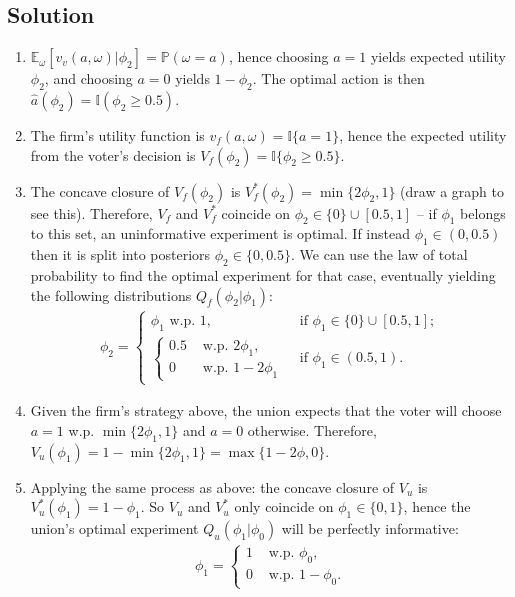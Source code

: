 \documentclass[a4paper]{article}
\newif\ifsolutions
\begin{document}
\ifsolutions
\subsection*{Solution}
\begin{enumerate}
	\item $\mathbb{E}_\omega[v_v(a,\omega)|\phi_2] = \mathbb{P}( \omega = a )$, hence choosing $a=1$ yields expected utility $\phi_2$, and choosing $a=0$ yields $1-\phi_2$. The optimal action is then $\hat{a}(\phi_2) = \mathbb{I}(\phi_2 \geq 0.5)$.
	
	\item The firm's utility function is $v_f(a,\omega) = \mathbb{I}\{a=1\}$, hence the expected utility from the voter's decision is $V_f(\phi_2) = \mathbb{I}\{\phi_2 \geq 0.5\}$.
	
	\item The concave closure of $V_f(\phi_2)$ is $V^*_f(\phi_2) = \min \{2\phi_2, 1 \}$ (draw a graph to see this). Therefore, $V_f$ and $V^*_f$ coincide on $\phi_2 \in \{0\} \cup [0.5,1]$ -- if $\phi_1$ belongs to this set, an uninformative experiment is optimal. If instead $\phi_1 \in (0,0.5)$ then it is split into posteriors $\phi_2 \in \{0,0.5\}$. We can use the law of total probability to find the optimal experiment for that case, eventually yielding the following distributions $Q_f(\phi_2|\phi_1)$:
	\begin{align*}
		\phi_2 = 
		\begin{cases}
			\phi_1 \text{ w.p. } 1, & \text{ if } \phi_1 \in \{0\} \cup [0.5,1];
			\\
			\begin{cases}
				0.5 & \text{ w.p. } 2 \phi_1,
				\\
				0 & \text{ w.p. } 1-2 \phi_1
			\end{cases}
			& \text{ if } \phi_1 \in (0.5,1).
		\end{cases}
	\end{align*}
	
	\item Given the firm's strategy above, the union expects that the voter will choose $a=1$ w.p. $\min\{2\phi_1, 1\}$ and $a=0$ otherwise. Therefore, $V_u(\phi_1) = 1 - \min\{2\phi_1, 1\} = \max \{ 1-2\phi, 0 \}$.
	
	\item Applying the same process as above: the concave closure of $V_u$ is $V^*_u(\phi_1) = 1-\phi_1$. So $V_u$ and $V^*_u$ only coincide on $\phi_1 \in \{0,1\}$, hence the union's optimal experiment $Q_u(\phi_1|\phi_0)$ will be perfectly informative:
	\begin{align*}
		\phi_1 = 
		\begin{cases}
			1 & \text{ w.p. } \phi_0,
			\\
			0 & \text{ w.p. } 1-\phi_0.
		\end{cases}
	\end{align*}
	

\end{enumerate}
\end{document}
